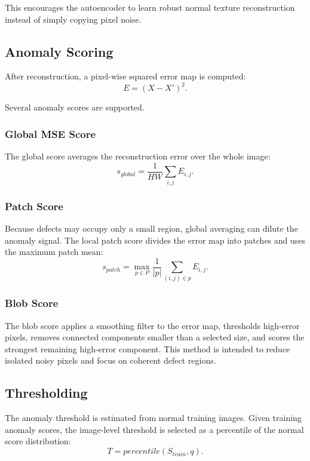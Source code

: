 \documentclass[conference]{IEEEtran}
\begin{document}
This encourages the autoencoder to learn robust normal texture reconstruction instead of simply copying pixel noise.

\subsection{Anomaly Scoring}
After reconstruction, a pixel-wise squared error map is computed:
\begin{equation}
    E = (X - X')^2.
\end{equation}

Several anomaly scores are supported.

\subsubsection{Global MSE Score}
The global score averages the reconstruction error over the whole image:
\begin{equation}
    s_{global} = \frac{1}{HW}\sum_{i,j} E_{i,j}.
\end{equation}

\subsubsection{Patch Score}
Because defects may occupy only a small region, global averaging can dilute the anomaly signal. The local patch score divides the error map into patches and uses the maximum patch mean:
\begin{equation}
    s_{patch} = \max_{p \in P} \frac{1}{|p|}\sum_{(i,j)\in p} E_{i,j}.
\end{equation}

\subsubsection{Blob Score}
The blob score applies a smoothing filter to the error map, thresholds high-error pixels, removes connected components smaller than a selected size, and scores the strongest remaining high-error component. This method is intended to reduce isolated noisy pixels and focus on coherent defect regions.

\subsection{Thresholding}
The anomaly threshold is estimated from normal training images. Given training anomaly scores, the image-level threshold is selected as a percentile of the normal score distribution:
\begin{equation}
    T = percentile(S_{train}, q).
\end{equation}
\end{document}
